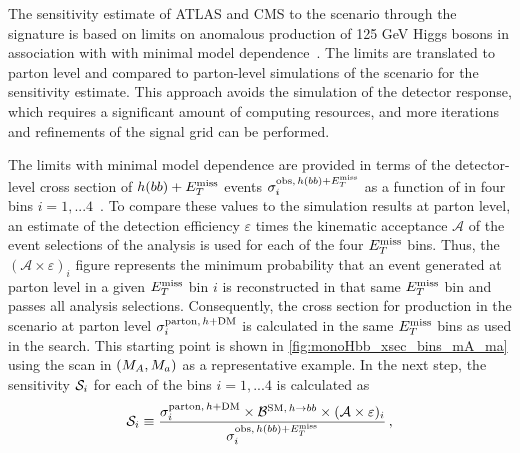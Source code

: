 The sensitivity estimate of ATLAS and CMS to the \hdma scenario through the \monohbb signature is based on limits on anomalous production of 125 GeV Higgs bosons in association with \met with minimal model dependence~\cite{Aaboud:2017yqz}. The limits are translated to parton level and compared to parton-level simulations of the \hdma scenario for the sensitivity estimate. This approach avoids the simulation of the detector response, which requires a significant amount of computing resources, and more iterations and refinements of the signal grid can be performed. 

The limits with minimal model dependence are provided in terms of the detector-level cross section of $h(bb)+E_T^\mathrm{miss}$ events $\sigma_{i}^{\mathrm{obs},\,h(bb)+E_T^\mathrm{miss}}$ as a function of \met in four bins $i=1,...4$~\cite{Aaboud:2017yqz}. 
To compare these values to the simulation results at parton level, 
an estimate of the detection efficiency $\varepsilon$ times the kinematic acceptance $\mathcal{A}$ of the event selections of the analysis is used for each of the four $E_T^\mathrm{miss}$ bins.
Thus, the $(\mathcal{A}\times\varepsilon)_i$ figure represents the minimum probability
that an event generated at parton level in a given $E_T^\mathrm{miss}$ bin $i$ is reconstructed in that same $E_T^\mathrm{miss}$ bin and passes all analysis selections.
Consequently, the cross section for \hdm production in the \hdma scenario at parton level $\sigma_{i}^{\mathrm{parton},\,h+\textrm{DM}}$ is calculated in the same $E_T^\mathrm{miss}$ bins as used in the \monohbb search. This starting point is shown in \autoref{fig:monoHbb_xsec_bins_mA_ma} using the scan in $(M_{A},M_{a})$ as a representative example. 
In the next step, the sensitivity $\mathcal{S}_i$ for each of the \met bins $i=1,...4$ is calculated as
\begin{equation}
\label{eq:monoHbb_sensi_i}
\mathcal{S}_i \equiv \frac{\sigma_{i}^{\mathrm{parton},\,h+\textrm{DM}} \times \mathcal{B}^{\mathrm{SM},\,h\to bb} \times (\mathcal{A\times\varepsilon})_{i} }
{\sigma_{i}^{\mathrm{obs},\,h(bb)+E_T^\mathrm{miss}}}\,,
\end{equation}
